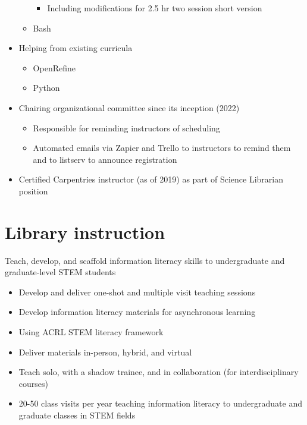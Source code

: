 \documentclass[
  letterpaper,
  DIV=11,
  numbers=noendperiod,
  oneside]{scrreprt}
\providecommand{\tightlist}{%
  \setlength{\itemsep}{0pt}\setlength{\parskip}{0pt}}\usepackage{longtable,booktabs,array}
\begin{document}
\begin{itemize}
\begin{itemize}
    \begin{itemize}
    \tightlist
    \item
      Including modifications for 2.5 hr two session short version
    \end{itemize}
  \item
    Bash
  \end{itemize}
\item
  Helping from existing curricula

  \begin{itemize}
  \tightlist
  \item
    OpenRefine
  \item
    Python
  \end{itemize}
\item
  Chairing organizational committee since its inception (2022)

  \begin{itemize}
  \tightlist
  \item
    Responsible for reminding instructors of scheduling
  \item
    Automated emails via Zapier and Trello to instructors to remind them
    and to listserv to announce registration
  \end{itemize}
\item
  Certified Carpentries instructor (as of 2019) as part of Science
  Librarian position
\end{itemize}

\section{Library instruction}\label{library-instruction}

Teach, develop, and scaffold information literacy skills to
undergraduate and graduate-level STEM students


\begin{itemize}
\tightlist
\item
  Develop and deliver one-shot and multiple visit teaching sessions
\item
  Develop information literacy materials for asynchronous learning
\item
  Using ACRL STEM literacy framework
\item
  Deliver materials in-person, hybrid, and virtual
\item
  Teach solo, with a shadow trainee, and in collaboration (for
  interdisciplinary courses)
\item
  20-50 class visits per year teaching information literacy to
  undergraduate and graduate classes in STEM fields
\end{itemize}
\end{document}
